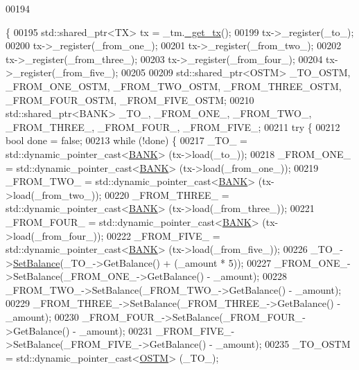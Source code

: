\begin{DoxyCode}
00194                                                                                                            
                                                                                                                  
                                            \{
00195     std::shared\_ptr<TX> tx = \_tm.\hyperlink{class_t_m_a41cb0226cc4080c931651b13f74a0075_a41cb0226cc4080c931651b13f74a0075}{\_get\_tx}();
00199     tx->\_register(\_to\_);
00200     tx->\_register(\_from\_one\_);
00201     tx->\_register(\_from\_two\_);
00202     tx->\_register(\_from\_three\_);
00203     tx->\_register(\_from\_four\_);
00204     tx->\_register(\_from\_five\_);
00205 
00209     std::shared\_ptr<OSTM> \_TO\_OSTM, \_FROM\_ONE\_OSTM, \_FROM\_TWO\_OSTM, \_FROM\_THREE\_OSTM, \_FROM\_FOUR\_OSTM, 
      \_FROM\_FIVE\_OSTM;
00210     std::shared\_ptr<BANK> \_TO\_, \_FROM\_ONE\_, \_FROM\_TWO\_, \_FROM\_THREE\_, \_FROM\_FOUR\_, \_FROM\_FIVE\_;
00211     \textcolor{keywordflow}{try} \{
00212         \textcolor{keywordtype}{bool} done = \textcolor{keyword}{false};
00213         \textcolor{keywordflow}{while} (!done) \{
00217             \_TO\_ = std::dynamic\_pointer\_cast<\hyperlink{class_b_a_n_k}{BANK}> (tx->load(\_to\_));
00218             \_FROM\_ONE\_ = std::dynamic\_pointer\_cast<\hyperlink{class_b_a_n_k}{BANK}> (tx->load(\_from\_one\_));
00219             \_FROM\_TWO\_ = std::dynamic\_pointer\_cast<\hyperlink{class_b_a_n_k}{BANK}> (tx->load(\_from\_two\_));
00220             \_FROM\_THREE\_ = std::dynamic\_pointer\_cast<\hyperlink{class_b_a_n_k}{BANK}> (tx->load(\_from\_three\_));
00221             \_FROM\_FOUR\_ = std::dynamic\_pointer\_cast<\hyperlink{class_b_a_n_k}{BANK}> (tx->load(\_from\_four\_));
00222             \_FROM\_FIVE\_ = std::dynamic\_pointer\_cast<\hyperlink{class_b_a_n_k}{BANK}> (tx->load(\_from\_five\_));
00226             \_TO\_->\hyperlink{class_b_a_n_k_ae3e45b407bf8ec7175662442ea24b7c0_ae3e45b407bf8ec7175662442ea24b7c0}{SetBalance}(\_TO\_->GetBalance() + (\_amount * 5));
00227             \_FROM\_ONE\_->SetBalance(\_FROM\_ONE\_->GetBalance() - \_amount);
00228             \_FROM\_TWO\_->SetBalance(\_FROM\_TWO\_->GetBalance() - \_amount);
00229             \_FROM\_THREE\_->SetBalance(\_FROM\_THREE\_->GetBalance() - \_amount);
00230             \_FROM\_FOUR\_->SetBalance(\_FROM\_FOUR\_->GetBalance() - \_amount);
00231             \_FROM\_FIVE\_->SetBalance(\_FROM\_FIVE\_->GetBalance() - \_amount);
00235             \_TO\_OSTM = std::dynamic\_pointer\_cast<\hyperlink{class_o_s_t_m}{OSTM}> (\_TO\_);

\end{DoxyCode}
